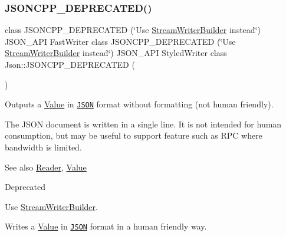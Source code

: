 \subsubsection{\texorpdfstring{J\+S\+O\+N\+C\+P\+P\+\_\+\+D\+E\+P\+R\+E\+C\+A\+T\+E\+D()}{JSONCPP\_DEPRECATED()}\hspace{0.1cm}{\footnotesize\ttfamily [2/2]}}
{\footnotesize\ttfamily class J\+S\+O\+N\+C\+P\+P\+\_\+\+D\+E\+P\+R\+E\+C\+A\+T\+ED (\char`\"{}Use \hyperlink{classJson_1_1StreamWriterBuilder}{Stream\+Writer\+Builder} instead\char`\"{}) J\+S\+O\+N\+\_\+\+A\+PI Fast\+Writer class J\+S\+O\+N\+C\+P\+P\+\_\+\+D\+E\+P\+R\+E\+C\+A\+T\+ED (\char`\"{}Use \hyperlink{classJson_1_1StreamWriterBuilder}{Stream\+Writer\+Builder} instead\char`\"{}) J\+S\+O\+N\+\_\+\+A\+PI Styled\+Writer class Json\+::\+J\+S\+O\+N\+C\+P\+P\+\_\+\+D\+E\+P\+R\+E\+C\+A\+T\+ED (\begin{DoxyParamCaption}\item[{\char`\"{}Use \hyperlink{classJson_1_1StreamWriterBuilder}{Stream\+Writer\+Builder} instead\char`\"{}}]{ }\end{DoxyParamCaption})}



Outputs a \hyperlink{classJson_1_1Value}{Value} in \href{http://www.json.org}{\tt J\+S\+ON} format without formatting (not human friendly). 

The J\+S\+ON document is written in a single line. It is not intended for \textquotesingle{}human\textquotesingle{} consumption, but may be useful to support feature such as R\+PC where bandwidth is limited. \begin{DoxySeeAlso}{See also}
\hyperlink{classJson_1_1Reader}{Reader}, \hyperlink{classJson_1_1Value}{Value} 
\end{DoxySeeAlso}
\begin{DoxyRefDesc}{Deprecated}
\item[\hyperlink{deprecated__deprecated000008}{Deprecated}]Use \hyperlink{classJson_1_1StreamWriterBuilder}{Stream\+Writer\+Builder}. \end{DoxyRefDesc}
Writes a \hyperlink{classJson_1_1Value}{Value} in \href{http://www.json.org}{\tt J\+S\+ON} format in a human friendly way.

